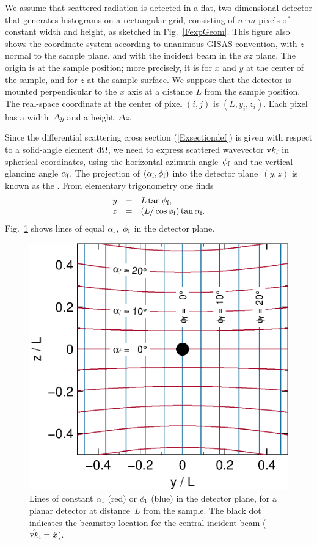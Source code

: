 We assume that scattered radiation is detected in a flat,
two-dimensional detector
that generates histograms on a rectangular grid,
consisting of $n\cdot m$ pixels of constant width and height,
as sketched in Fig.~\ref{FexpGeom}.
This figure also shows the coordinate system
%
%
according to unanimous GISAS convention,
with $z$ normal to the sample plane,
and with the incident beam in the $xz$ plane.
The origin is at the sample position;
more precisely, it is for $x$ and $y$ at the center of the sample,
and for $z$ at the sample surface.
We suppose that the detector is mounted perpendicular to the $x$ axis
at a distance $L$ from the sample position.
The real-space coordinate at the center of pixel $(i,j)$ is $(L,y_i,z_i)$.
Each pixel has a width~$\Delta y$ and a height~$\Delta z$.
%
%

Since the differential scattering cross section (\ref{Exsectiondef})
is given with respect to a solid-angle element $\text{d}\Omega$,
we need to express scattered wavevector $\text{v}{k}_{\text{f}}$ in spherical coordinates,
using the horizontal azimuth angle~$\phi_{\text{f}}$
and the vertical glancing angle $\alpha_{\text{f}}$.
The projection of $(\alpha_{\text{f}},\phi_{\text{f}})$ into
the detector plane~$(y,z)$ is known as the .
%
%
From elementary trigonometry one finds
\begin{equation}\label{Eyzdet}
  \begin{array}{lcl}
  y &=& L \tan\phi_{\text{f}},\\
  z &=& (L/ \cos\phi_{\text{f}}) \tan\alpha_{\text{f}}.
  \end{array}
\end{equation}
Fig.~\ref{Fconstalphi} shows lines of equal $\alpha_{\text{f}}$,~$\phi_{\text{f}}$
in the detector plane.

\begin{figure}[t]
\begin{center}
\includegraphics[width=.47\textwidth]{fig/drawing/SAS_const_alphi.ps}
\end{center}
\caption{Lines of constant $\alpha_{\text{f}}$ (red) or $\phi_{\text{f}}$ (blue)
in the detector plane,
for a planar detector at distance~$L$ from the sample.
The black dot indicates the beamstop location for 
the central incident beam ($\hat{\text{v}{k}}_{\text{i}} = \hat x$).}
\label{Fconstalphi}
\end{figure}

